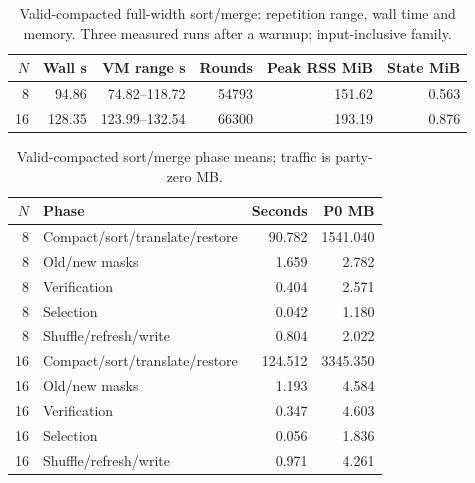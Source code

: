 \begin{table}[H]
\caption{Valid-compacted full-width sort/merge: repetition range, wall time and memory. Three measured runs after a warmup; input-inclusive family.}
\label{tab:compact_memory}\centering\small
\setlength{\tabcolsep}{3pt}
\begin{tabular}{rrrrrr}
\toprule
$N$ & Wall s & VM range s & Rounds & Peak RSS MiB & State MiB \\
\midrule
8 & 94.86 & 74.82--118.72 & 54793 & 151.62 & 0.563 \\
16 & 128.35 & 123.99--132.54 & 66300 & 193.19 & 0.876 \\
\bottomrule
\end{tabular}
\end{table}

\begin{table}[H]
\caption{Valid-compacted sort/merge phase means; traffic is party-zero MB.}
\label{tab:compact_phases}\centering\small
\setlength{\tabcolsep}{3pt}
\begin{tabular}{rlrr}
\toprule
$N$ & Phase & Seconds & P0 MB \\
\midrule
8 & Compact/sort/translate/restore & 90.782 & 1541.040 \\
8 & Old/new masks & 1.659 & 2.782 \\
8 & Verification & 0.404 & 2.571 \\
8 & Selection & 0.042 & 1.180 \\
8 & Shuffle/refresh/write & 0.804 & 2.022 \\
16 & Compact/sort/translate/restore & 124.512 & 3345.350 \\
16 & Old/new masks & 1.193 & 4.584 \\
16 & Verification & 0.347 & 4.603 \\
16 & Selection & 0.056 & 1.836 \\
16 & Shuffle/refresh/write & 0.971 & 4.261 \\
\bottomrule
\end{tabular}
\end{table}

